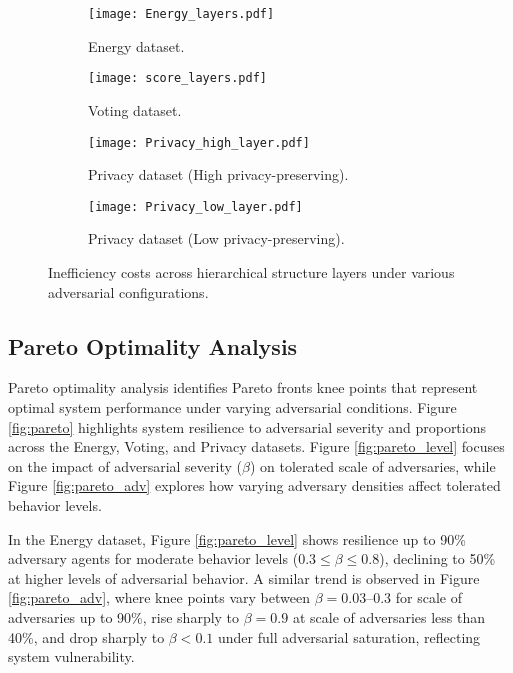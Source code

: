 \documentclass[journal]{IEEEtran}
\begin{document}
\begin{figure*}[htbp]
  \centering
  \begin{subfigure}{\textwidth}
    \centering
    \texttt{[image: Energy\_layers.pdf]}
    \caption{Energy dataset.}
    \label{layer_energy}
  \end{subfigure}

  \begin{subfigure}{\textwidth} 
    \centering
    \texttt{[image: score\_layers.pdf]}
    \caption{Voting dataset.}
    \label{layer_score}
  \end{subfigure}

  \begin{subfigure}{\textwidth} 
    \centering
    \texttt{[image: Privacy\_high\_layer.pdf]}
    \caption{Privacy dataset (High privacy-preserving).}
    \label{layer_high}
  \end{subfigure}
  
  \begin{subfigure}{\textwidth} 
    \centering
    \texttt{[image: Privacy\_low\_layer.pdf]}
    \caption{Privacy dataset (Low privacy-preserving).}
    \label{layer_low}
  \end{subfigure}

\caption{Inefficiency costs across hierarchical structure layers under various adversarial configurations.}
\label{fig:layers}
\end{figure*}

\subsection{Pareto Optimality Analysis}
Pareto optimality analysis identifies Pareto fronts knee points that represent optimal system performance under varying adversarial conditions. Figure \ref{fig:pareto} highlights system resilience to adversarial severity and proportions across the Energy, Voting, and Privacy datasets. Figure \ref{fig:pareto_level} focuses on the impact of adversarial severity ($\beta$) on tolerated scale of adversaries, while Figure \ref{fig:pareto_adv} explores how varying adversary densities affect tolerated behavior levels.

In the Energy dataset, Figure \ref{fig:pareto_level} shows resilience up to 90\% adversary agents for moderate behavior levels ($0.3 \leq \beta \leq 0.8$), declining to 50\% at higher levels of adversarial behavior. A similar trend is observed in Figure \ref{fig:pareto_adv}, where knee points vary between $\beta = 0.03$--$0.3$ for scale of adversaries up to 90\%, rise sharply to $\beta = 0.9$ at scale of adversaries less than 40\%, and drop sharply to $\beta < 0.1$ under full adversarial saturation, reflecting system vulnerability. 
\end{document}
